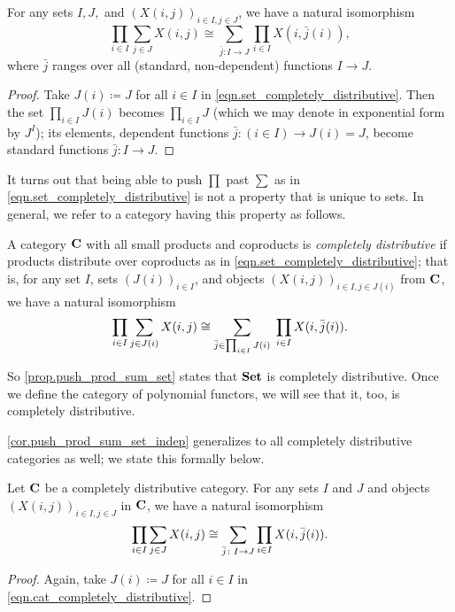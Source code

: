 \documentclass[Book-Poly]{subfiles}
\begin{document}
\begin{corollary} \label{cor.push_prod_sum_set_indep}
    For any sets $I, J,$ and $(X(i, j))_{i \in I, j \in J}$, we have a natural isomorphism
    \begin{equation} \label{eqn.push_prod_sum_set_indep}
        \prod_{i\in I}\sum_{j\in J}X(i,j)\cong\sum_{\bar{j}\colon I\to J}\prod_{i\in I}X(i,\bar{j}(i)),
    \end{equation}
    where $\bar{j}$ ranges over all (standard, non-dependent) functions $I\to J$.
\end{corollary}
\begin{proof}
    Take $J(i)\coloneqq J$ for all $i \in I$ in \eqref{eqn.set_completely_distributive}.
    Then the set $\prod_{i\in I}J(i)$ becomes $\prod_{i\in I}J$ (which we may denote in exponential form by $J^I$); its elements, dependent functions $\bar{j}\colon(i\in I)\to J(i)=J$, become standard functions $\bar{j}\colon I\to J$.
\end{proof}

It turns out that being able to push $\prod$ past $\sum$ as in \eqref{eqn.set_completely_distributive} is not a property that is unique to sets.
In general, we refer to a category having this property as follows.

\begin{definition}
    A category $\mathbf{C}$ with all small products and coproducts is \emph{completely distributive} if products distribute over coproducts as in \eqref{eqn.set_completely_distributive}; that is, for any set $I$, sets $(J(i))_{i\in I}$, and objects $(X(i,j))_{i\in I,j\in J(i)}$ from $\mathbf{C}$, we have a natural isomorphism
    \begin{equation}\label{eqn.cat_completely_distributive}
        \prod_{i\in I}\sum_{j\in J(i)}X(i,j)
        \cong
        \sum_{\bar{j}\in \prod_{i\in I}J(i)}\;\prod_{i\in I}X(i,\bar{j}(i)).
    \end{equation}
\end{definition}

So \cref{prop.push_prod_sum_set} states that $\mathbf{Set}$ is completely distributive.
Once we define the category of polynomial functors, we will see that it, too, is completely distributive.

\cref{cor.push_prod_sum_set_indep} generalizes to all completely distributive categories as well; we state this formally below.

\begin{corollary} \label{cor.push_prod_sum_obj_indep}
    Let $\mathbf{C}$ be a completely distributive category.
    For any sets $I$ and $J$ and objects $(X(i, j))_{i \in I, j \in J}$ in $\mathbf{C}$, we have a natural isomorphism
    \begin{equation} \label{eqn.push_prod_sum_obj_indep}
        \prod_{i\in I}\sum_{j\in J}X(i,j)\cong\sum_{\bar{j}\colon I\to J}\prod_{i\in I}X(i,\bar{j}(i)).
    \end{equation}
\end{corollary}
\begin{proof}
    Again, take $J(i)\coloneqq J$ for all $i \in I$ in \eqref{eqn.cat_completely_distributive}.
\end{proof}
\end{document}
